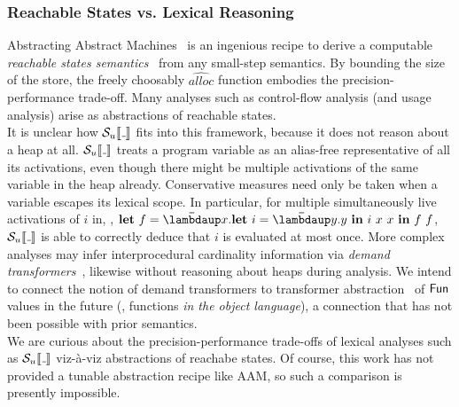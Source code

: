 \subsubsection*{Reachable States vs. Lexical Reasoning}
Abstracting Abstract Machines~\citep{aam} is an ingenious recipe to derive
a computable \emph{reachable states semantics}~\citep{Cousot:21} from any
small-step semantics.
By bounding the size of the store, the freely choosably
$\widehat{\mathit{alloc}}$ function embodies the precision-performance trade-off.
Many analyses such as control-flow analysis (and usage analysis) arise as
abstractions of reachable states. \\
It is unclear how $\semusg{\wild}$ fits into this framework, because it does not
reason about a heap at all.
$\semusg{\wild}$ treats a program variable as an alias-free representative of
all its activations, even though there might be multiple activations of the same
variable in the heap already.
Conservative measures need only be taken when a variable escapes its lexical
scope.
In particular, for multiple simultaneously live activations of $i$ in, \eg,
  ${\Let{f}{\Lam{x}{\Let{i}{\Lam{y}{y}}{i~x~x}}}{f~f}}$,
$\semusg{\wild}$ is able to correctly deduce that $i$ is evaluated at most once.
More complex analyses may infer interprocedural cardinality information via
\emph{demand transformers}~\citep{cardinality-ext}, likewise without reasoning
about heaps during analysis.
We intend to connect the notion of demand transformers to transformer
abstraction~\citep{Cousot:21} of $\mathsf{Fun}$ values in the future (\ie, functions
\emph{in the object language}), a connection that has not been possible with
prior semantics. \\
We are curious about the precision-performance trade-offs of lexical analyses
such as $\semusg{\wild}$ viz-à-viz abstractions of reachabe states. Of course,
this work has not provided a tunable abstraction recipe like AAM, so such a
comparison is presently impossible.


